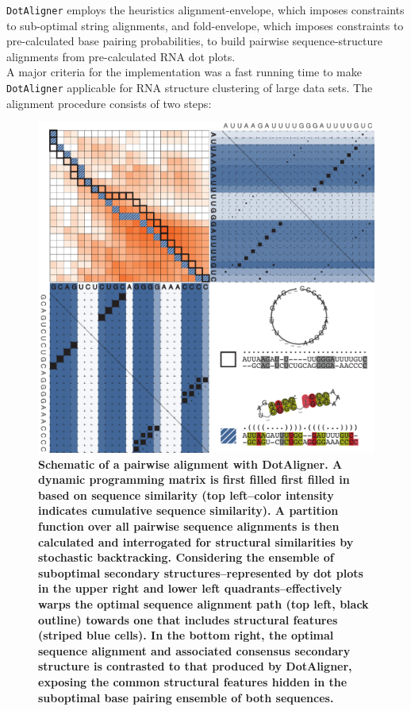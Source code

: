 \documentclass[a4paper,11pt]{article}
\newcommand\dotaligner{\texttt{DotAligner}}
\begin{document}
\dotaligner{} employs the heuristics alignment-envelope, which imposes
constraints to sub-optimal string alignments, and fold-envelope, which imposes
constraints to pre-calculated base pairing probabilities, to build pairwise 
sequence-structure alignments from pre-calculated RNA dot plots.\\

A major criteria for the implementation was a fast
running time to make \dotaligner{} applicable for RNA structure clustering of
large data sets. The alignment procedure consists of two steps:

\begin{figure}
 \includegraphics[width=\textwidth]{figX}
\caption \textbf{{Schematic of a pairwise alignment with DotAligner.} 
  A dynamic  programming matrix is first filled first filled in based on sequence 
  similarity (top left--color intensity indicates cumulative sequence similarity). 
  A partition function over all pairwise sequence alignments is then calculated and 
  interrogated for structural similarities by stochastic backtracking. Considering 
  the ensemble of suboptimal secondary structures--represented by dot plots in the 
  upper right and lower left quadrants--effectively warps the optimal sequence alignment 
  path (top left, black outline) towards one that includes structural features 
  (striped blue cells).  In the bottom right, the optimal sequence alignment 
  and associated consensus secondary structure is contrasted to that produced 
  by DotAligner, exposing the common structural features hidden in the suboptimal 
  base pairing ensemble of both sequences. 
 }
\end{figure}
\end{document}
